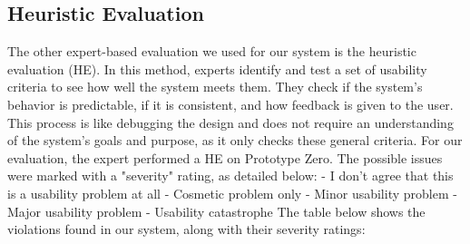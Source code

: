 \subsection{Heuristic Evaluation}
The other expert-based evaluation we used for our system is the heuristic evaluation (HE). In this method, experts identify and test a set of usability criteria to see how well the system meets them. They check if the system's behavior is predictable, if it is consistent, and how feedback is given to the user. This process is like debugging the design and does not require an understanding of the system's goals and purpose, as it only checks these general criteria.\newline
For our evaluation, the expert performed a HE on Prototype Zero. The possible issues were marked with a "severity" rating, as detailed below:\newline\newline
{} - I don’t agree that this is a usability problem at all\newline
{} - Cosmetic problem only\newline
{} - Minor usability problem\newline
{} - Major usability problem\newline
{} - Usability catastrophe\clearpage\noindent
The table below shows the violations found in our system, along with their severity ratings:
